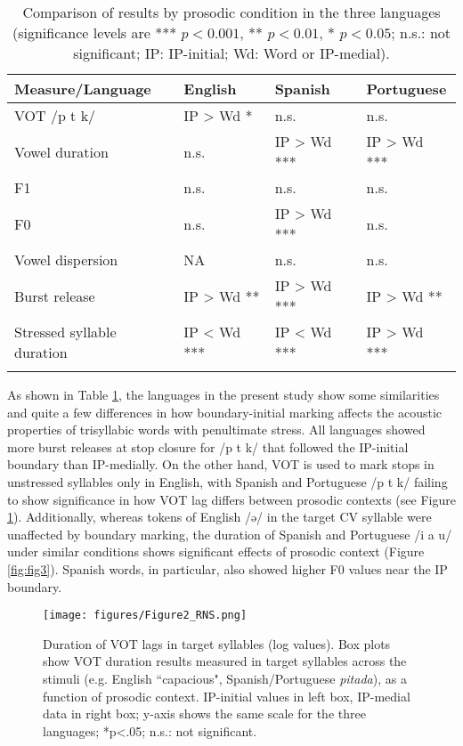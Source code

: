 \documentclass[output=paper]{langscibook}
\begin{document}
\begin{table}%
\caption{Comparison of results by prosodic condition in the three languages (significance levels are *** $p<0.001$, ** $p<0.01$, * $p<0.05$; n.s.: not significant; IP: IP-initial;  Wd: Word or IP-medial).}
\label{tab:table:3}
 \begin{tabularx}{1\textwidth}{Xlll}
  \lsptoprule
         Measure/Language &	English & Spanish	& Portuguese\\
  \midrule
VOT /p t k/             	& IP > Wd * &	n.s. &	n.s.\\
Vowel duration       &	n.s.&	IP > Wd ***&	IP > Wd ***\\
F1          &	n.s. &	n.s. &	n.s.\\
F0          &	n.s.&	IP > Wd ***&	n.s.\\
Vowel dispersion &	NA	& n.s. & 	n.s.\\
Burst release	& IP > Wd ** &	IP > Wd *** &	IP > Wd **\\
Stressed syllable duration &	IP < Wd *** &	IP < Wd *** &	IP > Wd ***\\
  \lspbottomrule
 \end{tabularx}
\end{table}



As shown in Table \ref{tab:table:3}, the languages in the present study show some similarities and quite a few differences in how boundary-initial marking affects the acoustic properties of trisyllabic words with penultimate stress. All languages showed more burst releases at stop closure for /p t k/ that followed the IP-initial boundary than IP-medially. On the other hand, VOT is used to mark stops in unstressed syllables only in English, with Spanish and Portuguese /p t k/ failing to show significance in how VOT lag differs between prosodic contexts (see Figure \ref{fig:fig2}). Additionally, whereas tokens of English /ə/ in the target CV syllable were unaffected by boundary marking, the duration of Spanish and Portuguese /i a u/ under similar conditions shows significant effects of prosodic context (Figure \ref{fig:fig3}). Spanish words, in particular, also showed higher F0 values near the IP boundary. 



\begin{figure}%
\texttt{[image: figures/Figure2\_RNS.png]}
\caption{Duration of VOT lags in target syllables (log values). Box plots show VOT duration results measured in target syllables across the stimuli (e.g. English ``capacious", Spanish/Portuguese \textit{pitada}), as a function of prosodic context. IP-initial values in left box, IP-medial data in right box; y-axis shows the same scale for the three languages; *p<.05; n.s.: not significant.}
\label{fig:fig2}
\end{figure}
\end{document}
